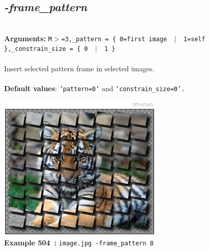 \documentclass[a4paper,11pt,twoside]{book}
\begin{document}
\subsection{\emph{-frame\_pattern} }\vspace*{-0.5em}
~\\\textbf{Arguments: } 
{\small \texttt{M$>$=3,\_pattern = \{ 0=first image ~$|$~ 1=self \},\_constrain\_size = \{ 0 ~$|$~ 1 \}}}\\~\\
Insert selected pattern frame in selected images.
~\\~\\\textbf{Default values}: {\small \texttt{'pattern=0'} and \texttt{'constrain\_size=0'.}}
\begin{center}\includegraphics[keepaspectratio=true,height=7cm,width=\textwidth]{img/gmic_def504.jpg}\\
{\footnotesize \textbf{Example 504~:} \texttt{image.jpg -frame\_pattern 8}}
\end{center}
\end{document}
